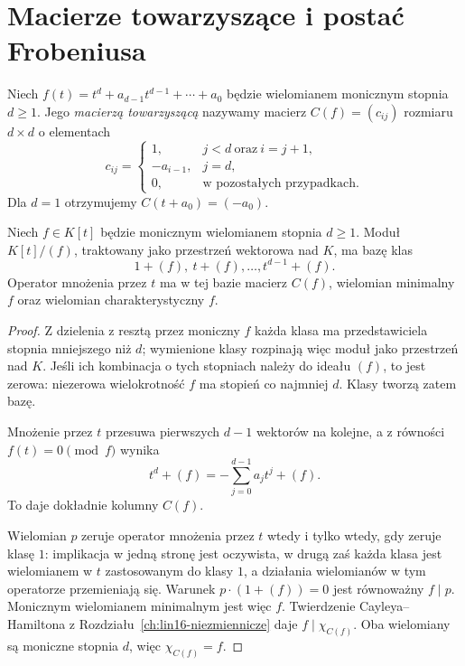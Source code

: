\section{Macierze towarzyszące i postać Frobeniusa}
\label{sec:lin19-frobenius}

\begin{definicja}
\label{def:lin19-companion}
Niech \(f(t)=t^d+a_{d-1}t^{d-1}+\cdots+a_0\)
będzie wielomianem monicznym
stopnia \(d\ge1\).
Jego \emph{macierzą towarzyszącą}
nazywamy macierz \(C(f)=(c_{ij})\)
rozmiaru \(d\times d\) o elementach
\[
 c_{ij}=
 \begin{cases}
 1,&j<d\ \text{oraz}\ i=j+1,\\
 -a_{i-1},&j=d,\\
 0,&\text{w pozostałych przypadkach}.
 \end{cases}
\]
Dla \(d=1\) otrzymujemy \(C(t+a_0)=(-a_0)\).
\end{definicja}

\begin{stwierdzenie}
\label{prop:lin19-companion-module}
Niech \(f\in K[t]\) będzie monicznym
wielomianem stopnia \(d\ge1\).
Moduł \(K[t]/(f)\), traktowany jako
przestrzeń wektorowa nad \(K\),
ma bazę klas
\[
 1+(f),\ t+(f),\ldots,t^{d-1}+(f).
\]
Operator mnożenia przez \(t\)
ma w tej bazie macierz \(C(f)\),
wielomian minimalny \(f\)
oraz wielomian charakterystyczny \(f\).
\end{stwierdzenie}
\begin{proof}
Z dzielenia z resztą przez moniczny \(f\)
każda klasa ma przedstawiciela
stopnia mniejszego niż \(d\);
wymienione klasy rozpinają więc moduł
jako przestrzeń nad \(K\).
Jeśli ich kombinacja o tych stopniach
należy do ideału \((f)\), to jest zerowa:
niezerowa wielokrotność \(f\)
ma stopień co najmniej \(d\).
Klasy tworzą zatem bazę.

Mnożenie przez \(t\) przesuwa
pierwszych \(d-1\) wektorów na kolejne,
a z równości \(f(t)=0\pmod f\) wynika
\[
 t^d+(f)=-\sum_{j=0}^{d-1}a_jt^j+(f).
\]
To daje dokładnie kolumny \(C(f)\).

Wielomian \(p\) zeruje
operator mnożenia przez \(t\)
wtedy i tylko wtedy, gdy zeruje klasę \(1\):
implikacja w jedną stronę jest oczywista,
w drugą zaś każda klasa jest wielomianem
w \(t\) zastosowanym do klasy \(1\),
a działania wielomianów w tym operatorze
przemieniają się.
Warunek \(p\cdot(1+(f))=0\)
jest równoważny \(f\mid p\).
Monicznym wielomianem minimalnym jest więc \(f\).
Twierdzenie Cayleya--Hamiltona
z Rozdziału~\ref{ch:lin16-niezmiennicze}
daje \(f\mid\chi_{C(f)}\).
Oba wielomiany są moniczne stopnia \(d\),
więc \(\chi_{C(f)}=f\).
\end{proof}

